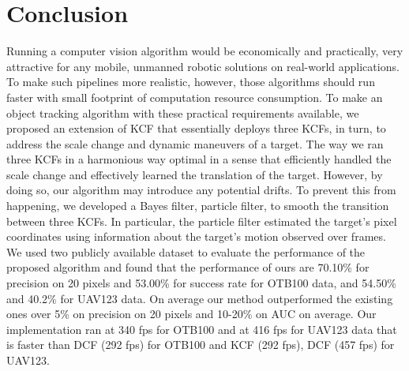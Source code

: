 \documentclass{bmvc2k}
\begin{document}
\section{Conclusion} \label{sc:Conclusion}
Running a computer vision algorithm would be economically and
practically, very attractive for any mobile, unmanned robotic
solutions on real-world applications. To make such pipelines more
realistic, however, those algorithms should run faster with small
footprint of computation resource consumption. To make an object
tracking algorithm with these practical requirements available, we
proposed an extension of KCF that essentially deploys three KCFs, in
turn, to address the scale change and dynamic maneuvers of a
target. The way we ran three KCFs in a harmonious way optimal in a
sense that efficiently handled the scale change and effectively
learned the translation of the target. However, by doing so, our
algorithm may introduce any potential drifts. To prevent this from
happening, we developed a Bayes filter, particle filter, to smooth the
transition between three KCFs. In particular, the particle filter
estimated the target's pixel coordinates using information about the
target's motion observed over frames. We used two publicly available
dataset to evaluate the performance of the proposed algorithm and
found that the performance of ours are 70.10\% for precision on 20
pixels and 53.00\% for success rate for OTB100 data, and 54.50\% and
40.2\% for UAV123 data. On average our method outperformed the
existing ones over 5\% on precision on 20 pixels and 10-20\% on AUC on
average. Our implementation ran at 340 fps for OTB100 and at 416 fps
for UAV123 data that is faster than DCF (292 fps) for OTB100 and KCF
(292 fps), DCF (457 fps) for UAV123. 


\end{document}
